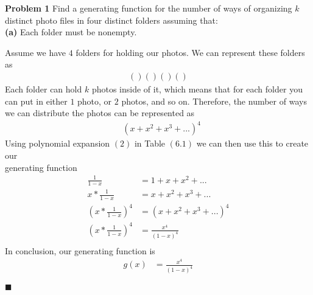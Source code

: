 \documentclass[12pt]{article}
\renewcommand{\qed}{\hfill$\blacksquare$}
\begin{document}

\noindent\textbf{Problem 1} Find a generating function for the number of ways of organizing $k$ distinct photo files in four distinct folders assuming that:\\
\noindent\textbf{(a)} Each folder must be nonempty.\\
\begin{addmargin}[1em]{1em}
    Assume we have $4$ folders for holding our photos. We can represent these folders as
    \begin{align*}
        ()()()()
    \end{align*}
    Each folder can hold $k$ photos inside of it, which means that for each folder you can put in either $1$ photo, or $2$ photos, and so on. Therefore, the number of ways we can distribute the photos can be represented as
    \begin{align*}
        &(x + x^2 + x^3 + ... )^4
    \end{align*}
    Using polynomial expansion $(2)$ in Table $(6.1)$ we can then use this to create our \\generating function
    \begin{align*}
        \frac{1}{1-x} &= 1 + x + x^2 + ...\\
        x * \frac{1}{1-x} &= x + x^2 + x^3 + ...\\
        (x * \frac{1}{1-x})^4 &= (x + x^2 + x^3 + ...)^4\\
        (x * \frac{1}{1-x})^4 &= \frac{x^4}{(1-x)^4}\\
    \end{align*}
    In conclusion, our generating function is 
    \begin{align*}
        g(x) &= \frac{x^4}{(1-x)^4}
    \end{align*}
    \begin{flushright}
    \qed
    \end{flushright}
\end{addmargin}
\end{document}
